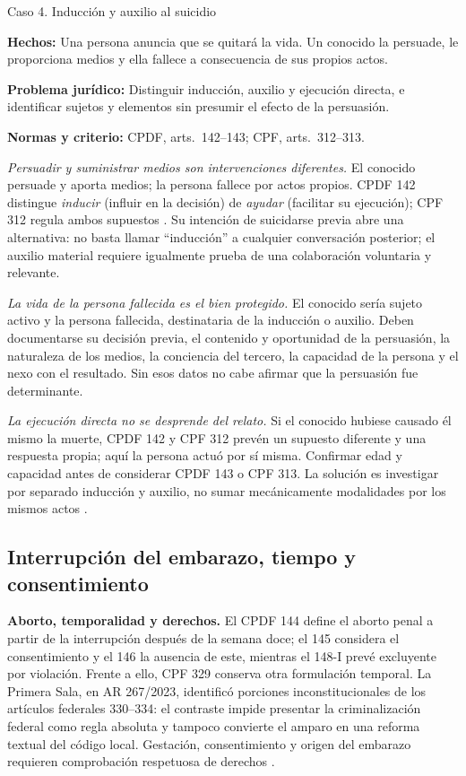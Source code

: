 \documentclass[spanish,letterpaper,oneside]{article}
\newcommand{\fichacaso}[3]{%
	\begin{tcolorbox}[colback=casoverde!5,colframe=casoverde!30,
		boxrule=0.4pt,arc=0.6mm,left=2mm,right=2mm,top=1mm,bottom=1mm]
	\textbf{Hechos:} #1\par
	\textbf{Problema jurídico:} #2\par
	\textbf{Normas y criterio:} #3
	\end{tcolorbox}%
}
\begin{document}
\begin{casoestudio}{Caso 4. Inducción y auxilio al suicidio}
\fichacaso{Una persona anuncia que se quitará la vida. Un conocido la persuade, le proporciona medios y ella fallece a consecuencia de sus propios actos.}{Distinguir inducción, auxilio y ejecución directa, e identificar sujetos y elementos sin presumir el efecto de la persuasión.}{CPDF, arts.~142--143; CPF, arts.~312--313.}
\textit{Persuadir y suministrar medios son intervenciones diferentes.} El conocido persuade y aporta medios; la persona fallece por actos propios. CPDF 142 distingue \emph{inducir} (influir en la decisión) de \emph{ayudar} (facilitar su ejecución); CPF 312 regula ambos supuestos \citep{cpdfS3Consolidado,cpfOficial2026}. Su intención de suicidarse previa abre una alternativa: no basta llamar ``inducción'' a cualquier conversación posterior; el auxilio material requiere igualmente prueba de una colaboración voluntaria y relevante.

\textit{La vida de la persona fallecida es el bien protegido.} El conocido sería sujeto activo y la persona fallecida, destinataria de la inducción o auxilio. Deben documentarse su decisión previa, el contenido y oportunidad de la persuasión, la naturaleza de los medios, la conciencia del tercero, la capacidad de la persona y el nexo con el resultado. Sin esos datos no cabe afirmar que la persuasión fue determinante.

\textit{La ejecución directa no se desprende del relato.} Si el conocido hubiese causado él mismo la muerte, CPDF 142 y CPF 312 prevén un supuesto diferente y una respuesta propia; aquí la persona actuó por sí misma. Confirmar edad y capacidad antes de considerar CPDF 143 o CPF 313. La solución es investigar por separado inducción y auxilio, no sumar mecánicamente modalidades por los mismos actos \citep{cpdfS3Consolidado,cpfOficial2026}.
\end{casoestudio}

\subsection*{Interrupción del embarazo, tiempo y consentimiento}
\textbf{Aborto, temporalidad y derechos.} El CPDF 144 define el aborto penal a partir de la interrupción después de la semana doce; el 145 considera el consentimiento y el 146 la ausencia de este, mientras el 148-I prevé excluyente por violación. Frente a ello, CPF 329 conserva otra formulación temporal. La Primera Sala, en AR 267/2023, identificó porciones inconstitucionales de los artículos federales 330--334: el contraste impide presentar la criminalización federal como regla absoluta y tampoco convierte el amparo en una reforma textual del código local. Gestación, consentimiento y origen del embarazo requieren comprobación respetuosa de derechos \citep{cpdfS3Consolidado,cpfOficial2026,scjnAR2672023}.
\end{document}
